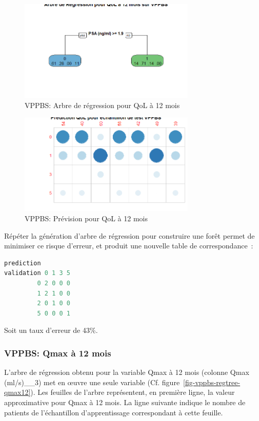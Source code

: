 \begin{figure}[H]
\centering
\includegraphics[width=0.75\textwidth]{../Fig/VPPBS/vppbs-regtree-qol12.png}
\caption{VPPBS: Arbre de régression pour QoL à 12 mois}
\label{fig-vppbs-regtree-qol12}
\end{figure}

\begin{figure}[H]
\centering
\includegraphics[width=0.75\textwidth]{../Fig/VPPBS/vppbs-regtree-predict-qol12.png}
\caption{VPPBS: Prévision pour QoL à 12 mois}
\label{fig-vppbs-regtree-predict-qol12}
\end{figure}

Répéter la génération d'arbre de régression pour construire une forêt permet de
minimiser ce risque d'erreur, et produit une nouvelle table de correspondance~:

\begin{lstlisting}[language=R]
           prediction
validation 0 1 3 5
         0 2 0 0 0
         1 2 1 0 0
         2 0 1 0 0
         5 0 0 0 1
\end{lstlisting}
Soit un taux d'erreur de 43\%.

\subsubsection{VPPBS: Qmax à 12 mois}

L'arbre de régression obtenu pour la variable Qmax à 12 mois (colonne Qmax (ml/s)\_\_3) met en {\oe}uvre une seule variable (Cf. figure~\ref{fig-vppbs-regtree-qmax12}). Les feuilles de l'arbre représentent, en première ligne, la valeur approximative pour Qmax à 12 mois. La ligne suivante indique le nombre de patients de l'échantillon d'apprentissage correspondant à cette feuille. 

